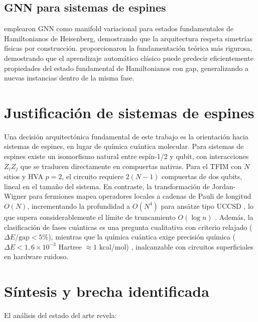 \documentclass[11pt,a4paper,spanish]{book}
\begin{document}
\subsection{GNN para sistemas de espines}

\citet{kochkov2021} emplearon GNN como manifold variacional para estados fundamentales de Hamiltonianos de Heisenberg, demostrando que la arquitectura respeta simetrías físicas por construcción. \citet{huang2022} proporcionaron la fundamentación teórica más rigurosa, demostrando que el aprendizaje automático clásico puede predecir eficientemente propiedades del estado fundamental de Hamiltonianos con gap, generalizando a nuevas instancias dentro de la misma fase.

\section{Justificación de sistemas de espines}

Una decisión arquitectónica fundamental de este trabajo es la orientación hacia sistemas de espines, en lugar de química cuántica molecular. Para sistemas de espines existe un isomorfismo natural entre espín-1/2 y qubit, con interacciones $Z_i Z_j$ que se traducen directamente en compuertas nativas. Para el TFIM con $N$ sitios y HVA $p = 2$, el circuito requiere $2(N-1)$ compuertas de dos qubits, lineal en el tamaño del sistema. En contraste, la transformación de Jordan-Wigner para fermiones mapea operadores locales a cadenas de Pauli de longitud $O(N)$, incrementando la profundidad a $O(N^4)$ para ansätze tipo UCCSD \citep{tilly2022}, lo que supera considerablemente el límite de truncamiento $O(\log n)$ \citep{mele2026}. Además, la clasificación de fases cuánticas es una pregunta cualitativa con criterio relajado ($\Delta E/\text{gap} < 5\%$), mientras que la química cuántica exige precisión química ($\Delta E < 1,6 \times 10^{-3}$ Hartree $\approx 1$ kcal/mol) \citep{tilly2022}, inalcanzable con circuitos superficiales en hardware ruidoso.

\section{Síntesis y brecha identificada}

El análisis del estado del arte revela:
\end{document}
